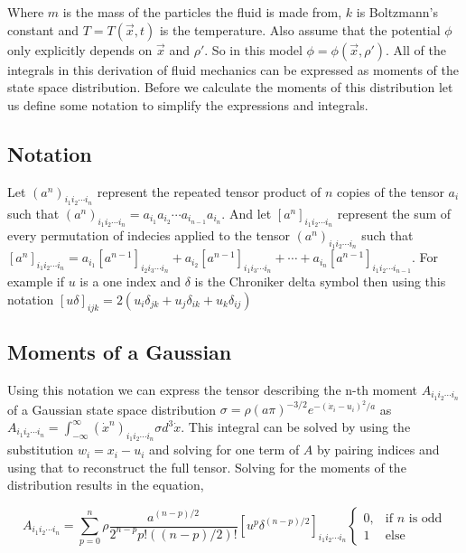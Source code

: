 \documentclass[%
 twocolumn,
 preprint, onecolumn,
 amsmath,amssymb,
 aps,
]{revtex4-1}
\newcommand{\intVdot}[1]{\int_{-\infty}^{\infty} #1 d^3\dot{x}}
\begin{document}
Where $m$ is the mass of the particles the fluid is made from, $k$ is Boltzmann's constant and $T=T(\vec{x}, t)$ is the temperature. Also assume that the potential $\phi$ only explicitly depends on $\vec{x}$ and $\rho'$. So in this model $\phi=\phi(\vec{x}, \rho')$. All of the integrals in this derivation of fluid mechanics can be expressed as moments of the state space distribution. Before we calculate the moments of this distribution let us define some notation to simplify the expressions and integrals.

\subsection{Notation}
Let $\left(a^n\right)_{i_1i_2\cdots i_n}$ represent the repeated tensor product of $n$ copies of the tensor $a_i$ such that $\left(a^n\right)_{i_1i_2\cdots i_n}=a_{i_1}a_{i_2}\cdots a_{i_{n-1}}a_{i_n}$. And let $\left[a^n\right]_{i_1i_2\cdots i_n}$ represent the sum of every permutation of indecies applied to the tensor $\left(a^n\right)_{i_1i_2\cdots i_n}$ such that $\left[a^n\right]_{i_1i_2\cdots i_n}=a_{i_1}\left[a^{n-1}\right]_{i_2i_3\cdots i_n} + a_{i_2}\left[a^{n-1}\right]_{i_1i_3\cdots i_n} + \cdots + a_{i_n}\left[a^{n-1}\right]_{i_1i_2\cdots i_{n-1}}$. For example if $u$ is a one index and $\delta$ is the Chroniker delta symbol then using this notation $\left[u\delta\right]_{ijk}=2\left(u_i\delta_{jk} + u_j\delta_{ik} + u_k\delta_{ij}\right)$

\subsection{Moments of a Gaussian}
Using this notation we can express the tensor describing the n-th moment $A_{i_1i_2\cdots i_n}$ of a Gaussian state space distribution $\sigma=\rho\left(a \pi\right)^{-3/2}e^{-\left(\dot{x}_i-u_i\right)^2/a}$ as $A_{i_1i_2\cdots i_n}=\intVdot{\left(\dot{x}^n\right)_{i_1i_2\cdots i_n}\sigma}$. This integral can be solved by using the substitution $w_i=x_i - u_i$ and solving for one term of $A$ by pairing indices and using that to reconstruct the full tensor. Solving for the moments of the distribution results in the equation,

\begin{widetext}
\begin{equation}
A_{i_1i_2\cdots i_n}=\sum_{p=0}^n\rho\frac{a^{\left(n-p\right)/2}}{2^{n-p}p!\left(\left(n-p\right)/2\right)!}\left[u^p\delta^{\left(n-p\right)/2}\right]_{i_1i_2\cdots i_n}
\begin{cases}
0, & \text{if $n$ is odd}\\
1 &  \text{else}
\end{cases}
\label{gaussian_moments}
\end{equation}
\end{widetext}
\end{document}
